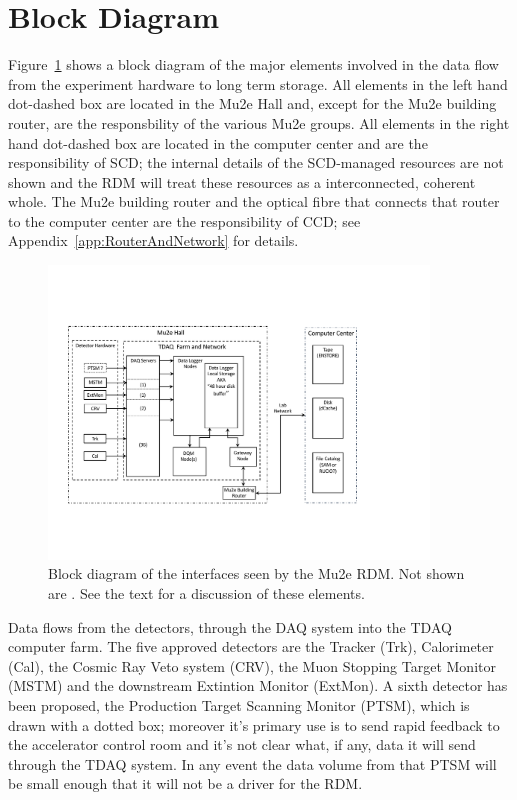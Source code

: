 \section{Block Diagram}
\label{sec:BlockDiagram}

Figure~\ref{fig:blockdiagram} shows a block diagram of the major elements involved
in the data flow from the experiment hardware to long term storage.
All elements in the left hand dot-dashed box are located in the Mu2e Hall
and, except for the Mu2e building router, are the responsbility of the various Mu2e groups.
All elements in the right hand dot-dashed box are located in the computer center
and are the responsibility of SCD; the internal details of the SCD-managed resources
are not shown and the RDM will treat these resources as a interconnected, coherent whole.
The Mu2e building router and the optical fibre that connects that router
to the computer center are the responsibility of CCD;
see Appendix~\ref{app:RouterAndNetwork} for details.

\begin{figure}[tbp]
\centering
\includegraphics[width=0.9\textwidth]{figures/interface_with_TDAQ.pdf}
\caption[Block diagram of interfaces seen by the Mu2e RDM]{
  Block diagram of the interfaces seen by the Mu2e RDM.
  Not shown are .  See the text for a discussion of these elements.}
\label{fig:blockdiagram}
\end{figure}

Data flows from the detectors, through the DAQ system into the TDAQ computer farm.
The five approved detectors are the Tracker (Trk), Calorimeter (Cal), the Cosmic Ray Veto system (CRV),
the Muon Stopping Target Monitor (MSTM) and the downstream Extintion Monitor (ExtMon).
A sixth detector has been proposed, the Production Target Scanning Monitor (PTSM),
which is drawn with a dotted box;
moreover it's primary use is to send rapid feedback to the accelerator control room
and it's not clear what, if any, data it will send through the TDAQ system.
In any event the data volume from that PTSM will be small enough that it will not be
a driver for the RDM.

